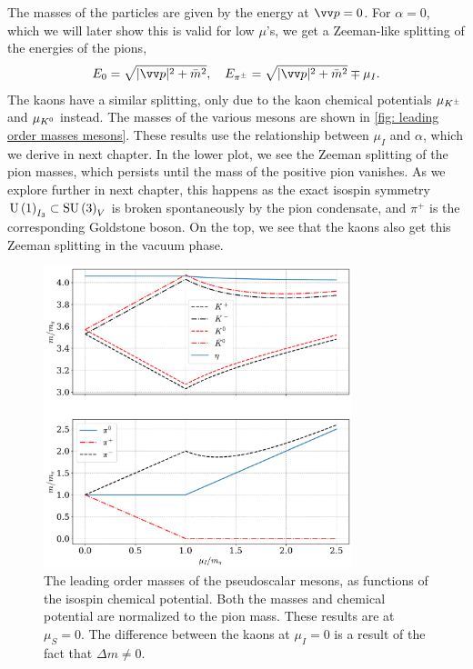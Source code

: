 \endgroup
%
The masses of the particles are given by the energy at $\vv p = 0$.
For $\alpha = 0$, which we will later show this is valid for low $\mu$'s, we get a Zeeman-like splitting of the energies of the pions,
%
\begin{equation}
    E_0 =\sqrt{|\vv p|^2 + \bar m^2}, \quad
    E_\pipm = \sqrt{|\vv p|^2 + \bar m^2} \mp \mu_I.
\end{equation}
%
The kaons have a similar splitting, only due to the kaon chemical potentials $\mu_{K^\pm}$ and $\mu_{K^0}$ instead.
The masses of the various mesons are shown in \autoref{fig: leading order masses mesons}.
These results use the relationship between $\mu_I$ and $\alpha$, which we derive in next chapter.
In the lower plot, we see the Zeeman splitting of the pion masses, which persists until the mass of the positive pion vanishes.
As we explore further in next chapter, this happens as the exact isospin symmetry $\text{U}\left(1\right)_{I_3} \subset \text{SU}\left(3\right)_V $ is broken spontaneously by the pion condensate, and $\pi^+$ is the corresponding Goldstone boson.
On the top, we see that the kaons also get this Zeeman splitting in the vacuum phase.
%
\begin{figure}
    \centering
    \includegraphics[width=0.8\textwidth]{../scripts/figurer/masses_mesons.pdf}
    \caption{
        The leading order masses of the pseudoscalar mesons, as functions of the isospin chemical potential.
        Both the masses and chemical potential are normalized to the pion mass.
        These results are at $\mu_S = 0$.
        The difference between the kaons at $\mu_I = 0$ is a result of the fact that $\Delta m \neq 0$.
        }
    \label{fig: leading order masses mesons}
\end{figure}
%

